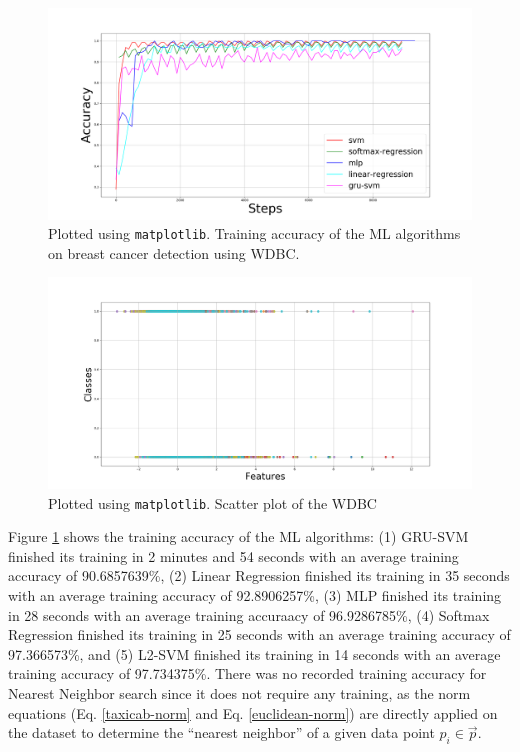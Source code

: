 \begin{figure}[!htb]
\centering
	\includegraphics[width=\linewidth]{training_accuracy.png}
	\caption{Plotted using \texttt{matplotlib}\cite{Hunter:2007}. Training accuracy of the ML algorithms on breast cancer detection using WDBC.}
	\label{training-accuracy}
\endminipage\hfill
\end{figure}
\begin{figure}[!htb]
\centering
	\includegraphics[width=\linewidth]{scatter_plot_data.png}
	\caption{Plotted using \texttt{matplotlib}\cite{Hunter:2007}. Scatter plot of the WDBC}
	\label{scatter-plot}
\endminipage\hfill
\end{figure}
\indent	Figure \ref{training-accuracy} shows the training accuracy of the ML algorithms: (1) GRU-SVM finished its training in 2 minutes and 54 seconds with an average training accuracy of 90.6857639\%, (2) Linear Regression finished its training in 35 seconds with an average training accuracy of 92.8906257\%, (3) MLP finished its training in 28 seconds with an average training accuraacy of 96.9286785\%, (4) Softmax Regression finished its training in 25 seconds with an average training accuracy of 97.366573\%, and (5) L2-SVM finished its training in 14 seconds with an average training accuracy of 97.734375\%. There was no recorded training accuracy for Nearest Neighbor search since it does not require any training, as the norm equations (Eq. \ref{taxicab-norm} and Eq. \ref{euclidean-norm}) are directly applied on the dataset to determine the ``nearest neighbor'' of a given data point $p_{i} \in \vec{p}$.\\
